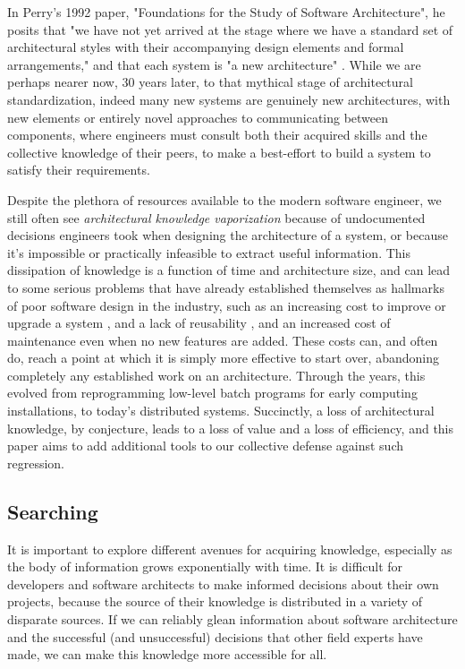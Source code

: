 \documentclass[a4paper, 12pt]{article}
\begin{document}
		In Perry's 1992 paper, "Foundations for the Study of Software Architecture", he posits that "we have not yet arrived at the stage where we have a standard set of architectural styles with their accompanying design elements and formal arrangements," and that each system is "a new architecture" \autocite{perry}. While we are perhaps nearer now, 30 years later, to that mythical stage of architectural standardization, indeed many new systems are genuinely new architectures, with new elements or entirely novel approaches to communicating between components, where engineers must consult both their acquired skills and the collective knowledge of their peers, to make a best-effort to build a system to satisfy their requirements.
		
		Despite the plethora of resources available to the modern software engineer, we still often see \textit{architectural knowledge vaporization}\autocite{jansen} because of undocumented decisions engineers took when designing the architecture of a system, or because it's impossible or practically infeasible to extract useful information. This dissipation of knowledge is a function of time and architecture size, and can lead to some serious problems that have already established themselves as hallmarks of poor software design in the industry, such as an increasing cost to improve or upgrade a system \autocite{jansen, perry}, and a lack of reusability \autocite{jansen}, and an increased cost of maintenance \autocite{randell} even when no new features are added. These costs can, and often do, reach a point at which it is simply more effective to start over, abandoning completely any established work on an architecture. Through the years, this evolved from reprogramming low-level batch programs for early computing installations\autocite{randell}, to today's distributed systems. Succinctly, a loss of architectural knowledge, by conjecture, leads to a loss of value and a loss of efficiency, and this paper aims to add additional tools to our collective defense against such regression.
		
	\subsection{Searching}
		It is important to explore different avenues for acquiring knowledge, especially as the body of information grows exponentially with time. It is difficult for developers and software architects to make informed decisions about their own projects, because the source of their knowledge is distributed in a variety of disparate sources. If we can reliably glean information about software architecture and the successful (and unsuccessful) decisions that other field experts have made, we can make this knowledge more accessible for all.
		
\end{document}
